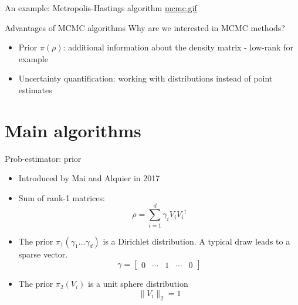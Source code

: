 \documentclass{beamer}
\begin{document}

\begin{frame}{An example: Metropolis-Hastings algorithm}
    \href{run:./mcmc.gif}{mcmc.gif}

\end{frame}

\begin{frame}{Advantages of MCMC algorithms}
    Why are we interested in MCMC methods?
    \begin{itemize}
        \item Prior $\pi(\rho)$: additional information about the density matrix - low-rank for example
        \item Uncertainty quantification: working with distributions instead of point estimates
    \end{itemize} 
\end{frame}
\section{Main algorithms}
\begin{frame}{Prob-estimator: prior}

    \begin{itemize}
        \item Introduced by Mai and Alquier in 2017 \cite{MA17}
        \item Sum of rank-1 matrices: \[\rho = \sum_{i=1}^{d} \gamma_i V_i {V_i}^\dagger\]
        \item The prior $\pi_1(\gamma_1 \dots \gamma_d)$ is a Dirichlet distribution. A typical draw leads to a sparse vector.
        \begin{equation*}
            \gamma = \begin{bmatrix}
                0 & \cdots & 1 & \cdots & 0
            \end{bmatrix}
        \end{equation*}
        \item The prior $\pi_2(V_i)$ is a unit sphere distribution
        \begin{equation*}
            \|V_i\|_2 = 1 
        \end{equation*}
    \end{itemize}
\end{frame}
\end{document}

